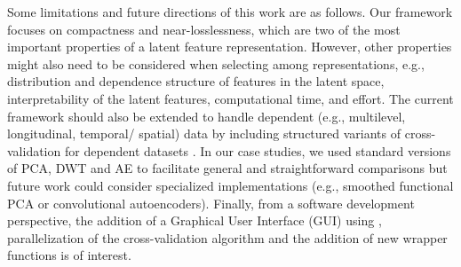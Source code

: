 Some limitations and future directions of this work are as follows.
Our framework focuses on compactness and near-losslessness, which are two of the most important properties of a latent feature representation.
However, other properties might also need to be considered when selecting among representations, e.g., distribution and dependence structure of features in the latent space, interpretability of the latent features, computational time, and effort.
The current framework should also be extended to handle dependent (e.g., multilevel, longitudinal, temporal/ spatial) data by including structured variants of cross-validation for dependent datasets
\parencite{bergmeir_note_2018, hornung_evaluating_2023, roberts_cross-validation_2017}.
In our case studies, we used standard versions of PCA, DWT and AE to facilitate general and straightforward comparisons but future work could consider specialized implementations (e.g., smoothed functional PCA or convolutional autoencoders). 
Finally, from a software development perspective, the addition of a Graphical User Interface (GUI) using  \parencite{chang_shiny_2021}, parallelization of the cross-validation algorithm and the addition of new wrapper functions is of interest.